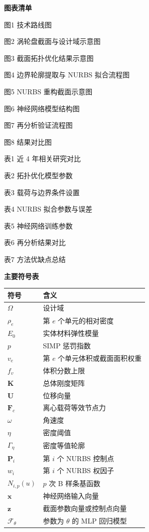 \documentclass{FRB-style}
\begin{document}
\noindent\textbf{图表清单}

图1 技术路线图

图2 涡轮盘截面与设计域示意图

图3 截面拓扑优化结果示意图

图4 边界轮廓提取与 NURBS 拟合流程图

图5 NURBS 重构截面示意图

图6 神经网络模型结构图

图7 再分析验证流程图

图8 结果对比图

表1 近 4 年相关研究对比

表2 拓扑优化模型参数

表3 载荷与边界条件设置

表4 NURBS 拟合参数与误差

表5 神经网络训练参数

表6 再分析结果对比

表7 方法优缺点总结

\vspace{1em}
\noindent\textbf{主要符号表}

\begin{longtable}{>{\raggedright\arraybackslash}p{} >{\raggedright\arraybackslash}p{}}
\toprule
符号 & 含义 \\
\midrule
$\Omega$ & 设计域 \\
$\rho_e$ & 第 $e$ 个单元的相对密度 \\
$E_0$ & 实体材料弹性模量 \\
$p$ & SIMP 惩罚指数 \\
$v_e$ & 第 $e$ 个单元体积或截面面积权重 \\
$f_v$ & 体积分数上限 \\
$\mathbf{K}$ & 总体刚度矩阵 \\
$\mathbf{U}$ & 位移向量 \\
$\mathbf{F}_c$ & 离心载荷等效节点力 \\
$\omega$ & 角速度 \\
$\eta$ & 密度阈值 \\
$\Gamma_\eta$ & 密度等值轮廓 \\
$\mathbf{P}_i$ & 第 $i$ 个 NURBS 控制点 \\
$w_i$ & 第 $i$ 个 NURBS 权因子 \\
$N_{i,p}(u)$ & $p$ 次 B 样条基函数 \\
$\mathbf{x}$ & 神经网络输入向量 \\
$\mathbf{z}$ & 截面参数向量或控制点向量 \\
$\mathcal{F}_{\theta}$ & 参数为 $\theta$ 的 MLP 回归模型 \\
\bottomrule
\end{longtable}
\end{document}
